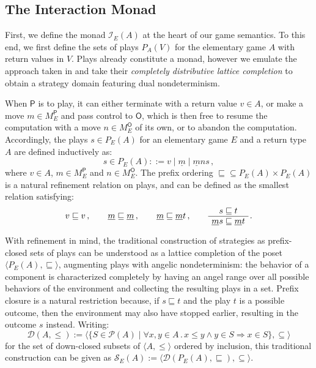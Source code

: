 \documentclass[format=sigplan,authordraft]{acmart}
\newcommand{\kw}[1]{\ensuremath{\mathsf{#1}}}
\begin{document}
\subsection{The Interaction Monad} \label{sec:monad:def} %

First,
we define the monad $\mathcal{I}_E(A)$
at the heart of our game semantics.
To this end,
we first define the sets of plays $P_A(V)$
for the elementary game $A$ with return values in $V$.
Plays already constitute a monad,
however we emulate the approach taken in \cite{cspdnd}
and take their \emph{completely distributive lattice completion}
to obtain a strategy domain featuring dual nondeterminism.

When $\kw{P}$ is to play,
it can either terminate with a return value $v \in A$,
or make a move $m \in M_E^\kw{P}$ and pass control to $\kw{O}$,
which is then free to resume the computation with
a move $n \in M_E^\kw{O}$ of its own,
or to abandon the computation.
Accordingly,
the plays $s \in P_E(A)$
for an elementary game $E$ and a return type $A$
are defined inductively as:
\[
  s \in P_E(A) ::= v \mid \underline{m} \mid \underline{m} ns \,,
\]
where $v \in A$, $m \in M_E^\kw{P}$ and $n \in M_E^\kw{O}$.
The prefix ordering
${\sqsubseteq} \subseteq P_E(A) \times P_E(A)$
is a natural refinement relation on plays,
and can be defined
as the smallest relation satisfying:
\[
  v \sqsubseteq v \,, \qquad
  \underline{m} \sqsubseteq \underline{m} \,, \qquad
  \underline{m} \sqsubseteq \underline{m}t \,, \qquad
  \AxiomC{$s \sqsubseteq t$}
  \UnaryInfC{$\underline{m}s \sqsubseteq \underline{m}t$}
  \DisplayProof \,.
\]

With refinement in mind,
the traditional construction of strategies
as prefix-closed sets of plays
can be understood as a lattice completion of the poset
$\langle P_E(A), {\sqsubseteq} \rangle$,
augmenting plays with angelic nondeterminism:
the behavior of a component is characterized completely
by having an angel range over all possible behaviors of the environment
and collecting the resulting plays in a set.
Prefix closure is a natural restriction because,
if $s \sqsubseteq t$ and the play $t$ is a possible outcome,
then the environment may also have stopped earlier,
resulting in the outcome $s$ instead.
Writing:
\[
  \mathcal{D}(A, {\le}) :=
    \langle
    \{ S \in \mathcal{P}(A) \mid
        \forall x, y \in A \,.\,
           x \le y \wedge y \in S \Rightarrow x \in S \},
    {\subseteq}
    \rangle
\]
for the set of down-closed subsets of $\langle A, {\le} \rangle$
ordered by inclusion,
this traditional construction can be given as
$\mathcal{S}_E(A) :=
\langle \mathcal{D}(P_E(A), {\sqsubseteq}), {\subseteq} \rangle$.
\end{document}
